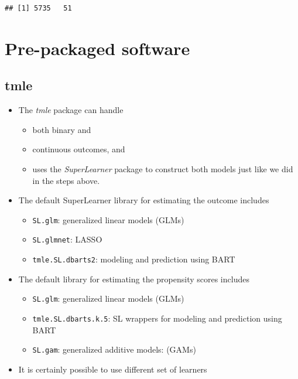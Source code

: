 \documentclass[
]{book}
\providecommand{\tightlist}{%
  \setlength{\itemsep}{0pt}\setlength{\parskip}{0pt}}
\begin{document}
\begin{verbatim}
## [1] 5735   51
\end{verbatim}

\hypertarget{pre-packaged-software}{%
\chapter{Pre-packaged software}\label{pre-packaged-software}}

\hypertarget{tmle-2}{%
\section{tmle}\label{tmle-2}}

\begin{itemize}
\tightlist
\item
  The \emph{tmle} package can handle

  \begin{itemize}
  \tightlist
  \item
    both binary and
  \item
    continuous outcomes, and
  \item
    uses the \emph{SuperLearner} package to construct both models just like we did in the steps above.
  \end{itemize}
\item
  The default SuperLearner library for estimating the outcome includes \citep{tmlePkgDocs}

  \begin{itemize}
  \tightlist
  \item
    \texttt{SL.glm}: generalized linear models (GLMs)
  \item
    \texttt{SL.glmnet}: LASSO
  \item
    \texttt{tmle.SL.dbarts2}: modeling and prediction using BART
  \end{itemize}
\item
  The default library for estimating the propensity scores includes

  \begin{itemize}
  \tightlist
  \item
    \texttt{SL.glm}: generalized linear models (GLMs)
  \item
    \texttt{tmle.SL.dbarts.k.5}: SL wrappers for modeling and prediction using BART
  \item
    \texttt{SL.gam}: generalized additive models: (GAMs)\\
  \end{itemize}
\item
  It is certainly possible to use different set of learners


\end{itemize}
\end{document}
